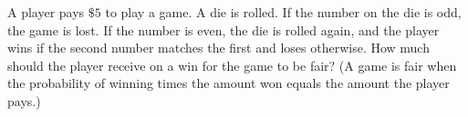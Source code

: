 A player pays $\$5$ to play a game. A die is rolled. If the number on the die is odd, the game is lost. If the number is even, the die is rolled again, and the player wins if the second number matches the first and loses otherwise. How much should the player receive on a win for the game to be fair? (A game is fair when the probability of winning times the amount won equals the amount the player pays.)
